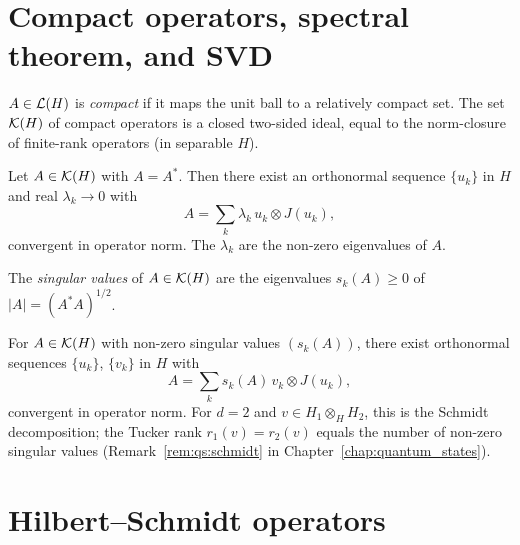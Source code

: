 \section{Compact operators, spectral theorem, and SVD}
\label{app:quantum:compact}

$A \in \mathcal{L}(H)$ is \emph{compact} if it maps the unit ball to a
relatively compact set. The set $\mathcal{K}(H)$ of compact operators is a
closed two-sided ideal, equal to the norm-closure of finite-rank
operators (in separable $H$).

\begin{theorem}
\label{thm:app:spectral}
Let $A \in \mathcal{K}(H)$ with $A = A^*$. Then there exist an orthonormal
sequence $\{u_k\}$ in $H$ and real $\lambda_k \to 0$ with
\begin{equation}
\label{eq:app:spectral}
    A = \sum_{k} \lambda_k\, u_k \otimes J(u_k),
\end{equation}
convergent in operator norm. The $\lambda_k$ are the non-zero
eigenvalues of $A$.
\end{theorem}

The \emph{singular values} of $A \in \mathcal{K}(H)$ are the eigenvalues
$s_k(A) \geq 0$ of $|A| = (A^*A)^{1/2}$.

\begin{theorem}
\label{thm:app:svd}
For $A \in \mathcal{K}(H)$ with non-zero singular values $(s_k(A))$, there
exist orthonormal sequences $\{u_k\}$, $\{v_k\}$ in $H$ with
\begin{equation}
\label{eq:app:svd}
    A = \sum_k s_k(A)\, v_k \otimes J(u_k),
\end{equation}
convergent in operator norm. For $d=2$ and $v \in H_1 \otimes_H H_2$,
this is the Schmidt decomposition; the Tucker rank $r_1(v) = r_2(v)$
equals the number of non-zero singular values
(Remark~\ref{rem:qs:schmidt} in Chapter~\ref{chap:quantum_states}).
\end{theorem}

\section{Hilbert--Schmidt operators}
\label{app:quantum:hs}

